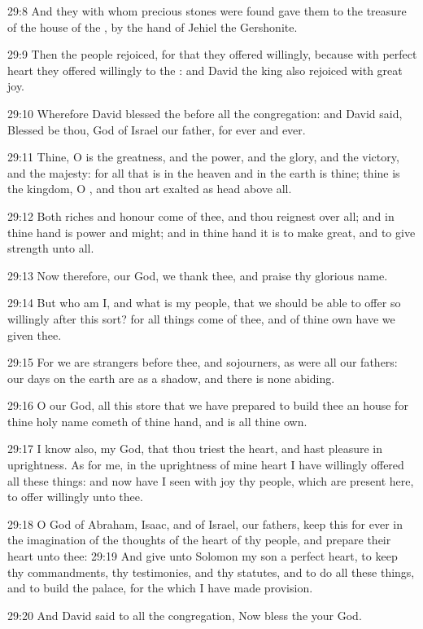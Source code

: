 29:8 And they with whom precious stones were found gave them to the treasure of the house of the \LORD, by the hand of Jehiel the Gershonite.

29:9 Then the people rejoiced, for that they offered willingly, because with perfect heart they offered willingly to the \LORD: and David the king also rejoiced with great joy.

29:10 Wherefore David blessed the \LORD before all the congregation: and David said, Blessed be thou, \LORD God of Israel our father, for ever and ever.

29:11 Thine, O \LORD is the greatness, and the power, and the glory, and the victory, and the majesty: for all that is in the heaven and in the earth is thine; thine is the kingdom, O \LORD, and thou art exalted as head above all.

29:12 Both riches and honour come of thee, and thou reignest over all; and in thine hand is power and might; and in thine hand it is to make great, and to give strength unto all.

29:13 Now therefore, our God, we thank thee, and praise thy glorious name.

29:14 But who am I, and what is my people, that we should be able to offer so willingly after this sort? for all things come of thee, and of thine own have we given thee.

29:15 For we are strangers before thee, and sojourners, as were all our fathers: our days on the earth are as a shadow, and there is none abiding.

29:16 O \LORD our God, all this store that we have prepared to build thee an house for thine holy name cometh of thine hand, and is all thine own.

29:17 I know also, my God, that thou triest the heart, and hast pleasure in uprightness. As for me, in the uprightness of mine heart I have willingly offered all these things: and now have I seen with joy thy people, which are present here, to offer willingly unto thee.

29:18 O \LORD God of Abraham, Isaac, and of Israel, our fathers, keep this for ever in the imagination of the thoughts of the heart of thy people, and prepare their heart unto thee: 29:19 And give unto Solomon my son a perfect heart, to keep thy commandments, thy testimonies, and thy statutes, and to do all these things, and to build the palace, for the which I have made provision.

29:20 And David said to all the congregation, Now bless the \LORD your God.

